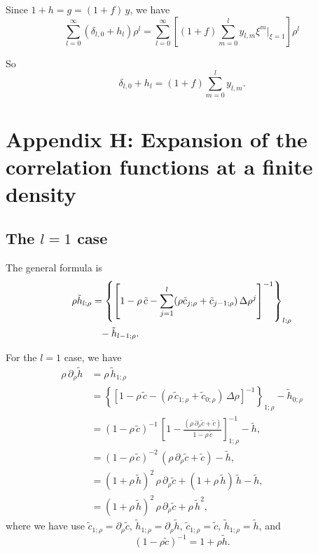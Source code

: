 \documentclass[preprint]{revtex4-1}
\numberwithin{equation}{subsection}
\numberwithin{table}{section}
\begin{document}
Since $1+h = g = (1+f) \,y$, we have
\[
  \sum_{l = 0}^\infty (\delta_{l,0} + h_{l}) \rho^l
=
  \sum_{l = 0}^\infty
  \left[
    (1 + f) \sum_{m = 0}^l y_{l, m} \xi^m \Big|_{\xi = 1}
  \right] \rho^l
\]

So
\[
  \delta_{l, 0} + h_l
  = (1 + f) \sum_{m=0}^l
  y_{l, m}.
\]



\section{Appendix H: Expansion of the correlation functions at a finite density}


\subsection{The $l = 1$ case}

The general formula is
\begin{align}
  \rho \tilde h_{l;\rho}
&=
\left\{
  \left[
    1 - \rho \, \tilde c
    - \sum_{j = 1}^l
        (\rho \tilde c_{j;\rho} + \tilde c_{j-1;\rho})
          \, \Delta \rho^j
  \right]^{-1}
\right\}_{l;\rho}
\notag \\
&\hphantom{=}- \tilde h_{l-1; \rho}.
\end{align}

For the $l = 1$ case, we have
\begin{align*}
  \rho \, \partial_\rho \tilde h
&=
  \rho \, \tilde h_{1;\rho}
\\
&=
\left\{
  \left[
    1 - \rho \, \tilde c
    - (\rho \, \tilde c_{1;\rho} + \tilde c_{0;\rho})
          \, \Delta \rho
  \right]^{-1}
\right\}_{1; \rho}
  - \tilde h_{0; \rho}
\\
&=
(1 - \rho \, \tilde c)^{-1} \,
\left[
  1 - \frac{ (\rho \, \partial_\rho \tilde c + \tilde c) }
           { 1 - \rho \, \tilde c }
\right]^{-1}_{1;\rho}
- \tilde h,
\\
&=
(1 - \rho \, \tilde c)^{-2} \,
(\rho \, \partial_\rho \tilde c + \tilde c)
- \tilde h,
\\
&=
(1 + \rho \, \tilde h)^2 \,
\rho \, \partial_\rho \tilde c
+ (1 + \rho \, \tilde h) \, \tilde h
- \tilde h,
\\
&=
(1 + \rho \, \tilde h)^2 \,
\rho \, \partial_\rho \tilde c
+ \rho \, \tilde h^2,
\end{align*}
where we have use
$\tilde c_{1;\rho} = \partial_\rho \tilde c$,
$\tilde h_{1;\rho} = \partial_\rho \tilde h$,
$\tilde c_{1;\rho} = \tilde c$,
$\tilde h_{1;\rho} = \tilde h$,
and
\[
  (1 - \rho \tilde c)^{-1}
=
  1 + \rho \tilde h.
\]
\end{document}
